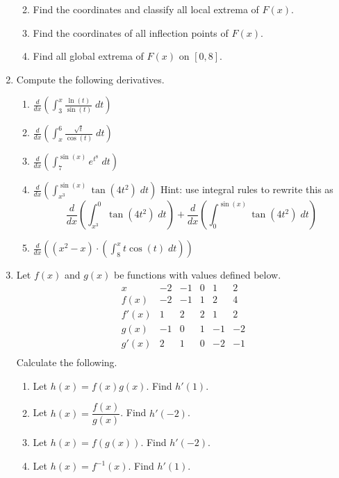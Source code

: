 \documentclass[11pt]{article}
\newcommand{\ds}{\displaystyle}
\begin{document}
\begin{enumerate}
\begin{enumerate}
    \newpage
    
  \item Find the coordinates and classify all local extrema of $F(x)$.
    \vfill
  \item Find the coordinates of all inflection points of $F(x)$.
    \vfill
  \item Find all global extrema of $F(x)$ on $[0,8]$.
    \vfill
  \end{enumerate}
  
  \newpage
  
\item Compute the following derivatives.
  \begin{enumerate}
  \item $\ds\frac{d}{dx}\left(\int_3^x \frac{\ln(t)}{\sin(t)}\;dt\right)$ \vfill
  \item $\ds\frac{d}{dx}\left(\int_x^6 \frac{\sqrt{t}}{\cos(t)}\;dt\right)$ \vfill
  \item $\ds\frac{d}{dx}\left(\int_7^{\sin(x)} e^{t^8}\;dt\right)$ \vfill
    \newpage
  \item $\ds\frac{d}{dx}\left(\int_{x^{3}}^{\sin(x)}
      \tan(4t^2)\;dt\right)$ Hint: use integral rules to rewrite this
    as
    \[
    \frac{d}{dx}\left(\int_{x^{3}}^{0} \tan(4t^2)\;dt\right) +
    \frac{d}{dx}\left(\int_{0}^{\sin(x)} \tan(4t^2)\;dt\right)
    \]
    \vfill
  \item $\ds\frac{d}{dx}\left(\left(x^2-x\right) \cdot
      \left(\int_{8}^{x} t\cos(t)\;dt\right)\right)$ \vfill
  \end{enumerate}
  
  \newpage
  
\item Let $f(x)$ and $g(x)$ be functions with values defined below.
  \[
  \begin{array}{c||c|c|c|c|c}
    x & -2 & -1 & 0 & 1 & 2\\
    \hline\hline
    f(x) & -2 & -1 & 1 & 2 & 4\\ \hline
    f'(x) & 1 & 2 & 2 & 1 & 2\\ \hline
    g(x) & -1 & 0 & 1 & -1 & -2\\ \hline
    g'(x) & 2 & 1 & 0 & -2 & -1\\ 
  \end{array}
  \]
  Calculate the following.
  \begin{enumerate}
  \item Let $h(x)=f(x)g(x)$.  Find $h'(1)$.\vfill
  \item Let $h(x)=\dfrac{f(x)}{g(x)}$.  Find $h'(-2)$.\vfill
  \item Let $h(x)=f(g(x))$.  Find $h'(-2)$.\vfill
  \item Let $h(x)=f^{-1}(x)$.  Find $h'(1)$.\vfill
  \end{enumerate}
  

\end{enumerate}
\end{document}
